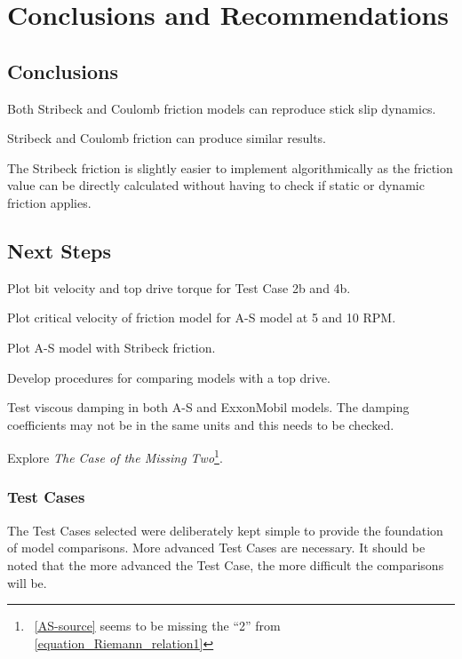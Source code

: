 \chapter{Conclusions and Recommendations}
\section{Conclusions}

\begin{bulletedlist}
	\item Both Stribeck and Coulomb friction models can reproduce stick slip dynamics.
	\item Stribeck and Coulomb friction can produce similar results.
	\item The Stribeck friction is slightly easier to implement algorithmically as the friction value can be directly calculated without having to check if static or dynamic friction applies.
\end{bulletedlist}

\section{Next Steps}
\begin{bulletedlist}
	\item Plot bit velocity and top drive torque for Test Case 2b and 4b.
	\item Plot critical velocity of friction model for A-S model at 5 and 10 RPM.
	\item Plot A-S model with Stribeck friction.
	\item Develop procedures for comparing models with a top drive.
	\item Test viscous damping in both A-S and ExxonMobil models.  The damping coefficients may not be in the same units and this needs to be checked.
	\item Explore \emph{The Case of the Missing Two}\footnote{\equationname~\ref{AS-source} seems to be missing the ``2'' from \equationname~\ref{equation_Riemann_relation1}}.
\end{bulletedlist}

\subsection{Test Cases}
The Test Cases selected were deliberately kept simple to provide the foundation of model comparisons.  More advanced Test Cases are necessary.  It should be noted that the more advanced the Test Case, the more difficult the comparisons will be.

